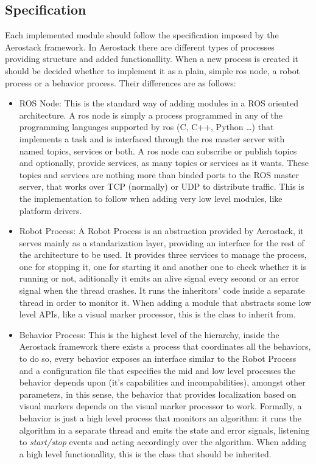   \subsection{Specification} \label{ch_4:subsect:specs}

    Each implemented module should follow the specification imposed by the Aerostack framework. In Aerostack there are different types of processes providing structure and added functionallity. When a new process is created it should be decided whether to implement it as a plain, simple ros node, a robot process or a behavior process. Their differences are as follows:

    \begin{itemize}
      \item ROS Node: This is the standard way of adding modules in a ROS oriented architecture. A ros node is simply a process programmed in any of the programming languages supported by ros (C, C++, Python \dots) that implements a task and is interfaced through the ros master server with named topics, services or both. A ros node can subscribe or publish topics and optionally, provide services, as many topics or services as it wants. These topics and services are nothing more than binded ports to the ROS master server, that works over TCP (normally) or UDP to distribute traffic. This is the implementation to follow when adding very low level modules, like platform drivers.
      \item Robot Process: A Robot Process is an abstraction provided by Aerostack, it serves mainly as a standarization layer, providing an interface for the rest of the architecture to be used. It provides three services to manage the process, one for stopping it, one for starting it and another one to check whether it is running or not, aditionally it emits an alive signal every second or an error signal when the thread crashes. It runs the inheritors' code inside a separate thread in order to monitor it. When adding a module that abstracts some low level APIs, like a visual marker processor, this is the class to inherit from.
      \item Behavior Process: This is the highest level of the hierarchy, inside the Aerostack framework there exists a process that coordinates all the behaviors, to do so, every behavior exposes an interface similar to the Robot Process and a configuration file that especifies the mid and low level processes the behavior depends upon (it's capabilities and incompabilities), amongst other parameters, in this sense, the behavior that provides localization based on visual markers depends on the visual marker processor to work. Formally, a behavior is just a high level process that monitors an algorithm: it runs the algorithm in a separate thread and emits the state and error signals, listening to \textit{start/stop} events and acting accordingly over the algorithm. When adding a high level functionallity, this is the class that should be inherited.
    \end{itemize}

